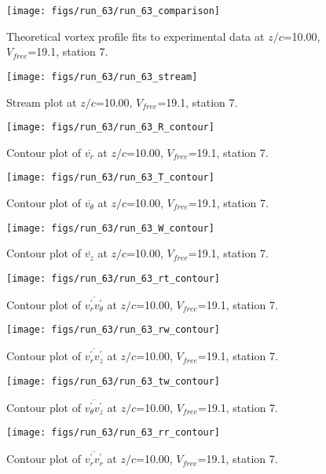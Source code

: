 \begin{figure}[H]
\centering
\texttt{[image: figs/run\_63/run\_63\_comparison]}
\caption{Theoretical vortex profile fits to experimental data at $z/c$=10.00, $V_{free}$=19.1, station 7.}
\end{figure}


\begin{figure}[H]
\centering
\texttt{[image: figs/run\_63/run\_63\_stream]}
\caption{Stream plot at $z/c$=10.00, $V_{free}$=19.1, station 7.}
\end{figure}


\begin{figure}[H]
\centering
\texttt{[image: figs/run\_63/run\_63\_R\_contour]}
\caption{Contour plot of $\overline{v_{r}}$ at $z/c$=10.00, $V_{free}$=19.1, station 7.}
\end{figure}


\begin{figure}[H]
\centering
\texttt{[image: figs/run\_63/run\_63\_T\_contour]}
\caption{Contour plot of $\overline{v_{\theta}}$ at $z/c$=10.00, $V_{free}$=19.1, station 7.}
\end{figure}


\begin{figure}[H]
\centering
\texttt{[image: figs/run\_63/run\_63\_W\_contour]}
\caption{Contour plot of $\overline{v_{z}}$ at $z/c$=10.00, $V_{free}$=19.1, station 7.}
\end{figure}


\begin{figure}[H]
\centering
\texttt{[image: figs/run\_63/run\_63\_rt\_contour]}
\caption{Contour plot of $\overline{v_{r}^{\prime} v_{\theta}^{\prime}}$ at $z/c$=10.00, $V_{free}$=19.1, station 7.}
\end{figure}


\begin{figure}[H]
\centering
\texttt{[image: figs/run\_63/run\_63\_rw\_contour]}
\caption{Contour plot of $\overline{v_{r}^{\prime} v_{z}^{\prime}}$ at $z/c$=10.00, $V_{free}$=19.1, station 7.}
\end{figure}


\begin{figure}[H]
\centering
\texttt{[image: figs/run\_63/run\_63\_tw\_contour]}
\caption{Contour plot of $\overline{v_{\theta}^{\prime} v_{z}^{\prime}}$ at $z/c$=10.00, $V_{free}$=19.1, station 7.}
\end{figure}


\begin{figure}[H]
\centering
\texttt{[image: figs/run\_63/run\_63\_rr\_contour]}
\caption{Contour plot of $\overline{v_{r}^{\prime} v_{r}^{\prime}}$ at $z/c$=10.00, $V_{free}$=19.1, station 7.}
\end{figure}


